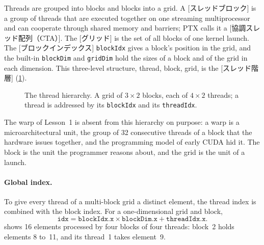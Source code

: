 \documentclass[../main.tex]{subfiles}
\begin{document}
\begin{definition}
  Threads are grouped into blocks and blocks into a grid.  A
  [スレッドブロック] is a group of threads that are
  executed together on one streaming multiprocessor and can cooperate
  through shared memory and barriers; PTX calls it a
  [協調スレッド配列（CTA）].
  The [グリッド] is the set of all blocks of one kernel
  launch.  The [ブロックインデックス] \texttt{blockIdx}
  gives a block's position in the grid, and the built-in
  \texttt{blockDim} and \texttt{gridDim} hold the sizes of a block and of
  the grid in each dimension.  This three-level structure, thread, block,
  grid, is the [スレッド階層]
  (\cref{fig:l03-thread-hierarchy}).
\end{definition}

\begin{figure}[tb]
  \centering
  
  \caption{The thread hierarchy.  A grid of $3\times2$ blocks, each of
    $4\times2$ threads; a thread is addressed by its \texttt{blockIdx}
    and its \texttt{threadIdx}.}
  \label{fig:l03-thread-hierarchy}
\end{figure}

The warp of Lesson~1 is absent from this hierarchy on purpose: a warp is a
microarchitectural unit, the group of 32 consecutive threads of a block
that the hardware issues together, and the programming model of early
CUDA hid it.  The block is the unit the programmer reasons about, and the
grid is the unit of a launch.

\paragraph{Global index.}  To give every thread of a multi-block grid a
distinct element, the thread index is combined with the block index.  For
a one-dimensional grid and block,
\begin{equation}
  \texttt{idx} = \texttt{blockIdx.x} \times \texttt{blockDim.x} +
  \texttt{threadIdx.x}.
  \label{eq:l03-global-index}
\end{equation}
 shows 16 elements processed by four blocks of
four threads: block~2 holds elements 8 to~11, and its thread~1 takes
element~9.
\end{document}
